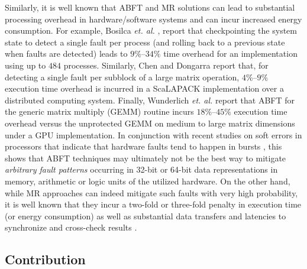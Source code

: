 \documentclass[twocolumn,english,onecolumn]{IEEEtran}
\theoremstyle{plain}
\theoremstyle{plain}
\begin{document}
Similarly, it is well known that ABFT and MR solutions can lead to
substantial processing overhead in hardware/software systems and can
incur increased energy consumption. For example, Bosilca \emph{et.
al.} \cite{bosilca2009algorithm}, report that checkpointing the system
state to detect a single fault per process (and rolling back to a
previous state when faults are detected) leads to $9\%$--$34\%$
time overhead for an implementation using up to $484$ processes.
Similarly, Chen and Dongarra \cite{chen2005fault} report that, for
detecting a single fault per subblock of a large matrix operation,
$4\%$--$9\%$ execution time overhead is incurred in a ScaLAPACK
implementation over a distributed computing system. Finally, Wunderlich
\emph{et. al.} \cite{Wunderlich2013} report that ABFT for the generic
matrix multiply (GEMM) routine incurs $18\%$--$45\%$ execution time
overhead versus the unprotected GEMM on medium to large matrix dimensions
under a GPU implementation. In conjunction with recent studies on
soft errors in processors that indicate that hardware faults tend
to happen in bursts \cite{quinn2011ccc,nicolaidis2012design,alameldeen2011energy},
this shows that ABFT techniques may ultimately not be the best way
to mitigate \emph{arbitrary fault patterns} occurring in 32-bit or
64-bit data representations in memory, arithmetic or logic units of
the utilized hardware. On the other hand, while MR approaches can
indeed mitigate such faults with very high probability, it is well
known that they incur a two-fold or three-fold penalty in execution
time (or energy consumption) as well as substantial data transfers
and latencies to synchronize and cross-check results \cite{engelmann2009case}.


\subsection{Contribution }
\end{document}
